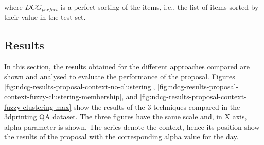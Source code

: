 \documentclass[preprint]{elsarticle}
\begin{document}
\begin{spacing}{1.5}
\noindent where $DCG_{perfect}$ is a perfect sorting of the items, i.e., the list of items sorted by their value in the test set.

\subsection{Results}

In this section, the results obtained for the different approaches compared are shown and analysed to evaluate the performance of the proposal. Figures \ref{fig:ndcg-results-proposal-context-no-clustering}, \ref{fig:ndcg-results-proposal-context-fuzzy-clustering-membership}, and \ref{fig:ndcg-results-proposal-context-fuzzy-clustering-max} show the results of the 3 techniques compared in the 3dprinting QA dataset. The three figures have the same scale and, in X axis, alpha parameter is shown. The series denote the context, hence its position show the results of the proposal with the corresponding alpha value for the day.


\end{spacing}
\end{document}

